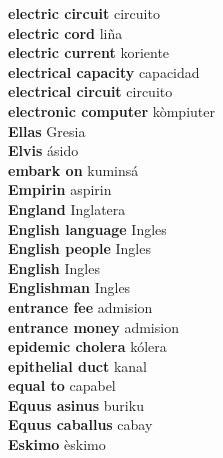 \textbf{ electric circuit  } circuito \\
\textbf{ electric cord  } liña \\
\textbf{ electric current  } koriente \\
\textbf{ electrical capacity  } capacidad \\
\textbf{ electrical circuit  } circuito \\
\textbf{ electronic computer  } kòmpiuter \\
\textbf{ Ellas  } Gresia \\
\textbf{ Elvis  } ásido \\
\textbf{ embark on  } kuminsá \\
\textbf{ Empirin  } aspirin \\
\textbf{ England  } Inglatera \\
\textbf{ English language  } Ingles \\
\textbf{ English people  } Ingles \\
\textbf{ English  } Ingles \\
\textbf{ Englishman  } Ingles \\
\textbf{ entrance fee  } admision \\
\textbf{ entrance money  } admision \\
\textbf{ epidemic cholera  } kólera \\
\textbf{ epithelial duct  } kanal \\
\textbf{ equal to  } capabel \\
\textbf{ Equus asinus  } buriku \\
\textbf{ Equus caballus  } cabay \\
\textbf{ Eskimo  } èskimo \\
